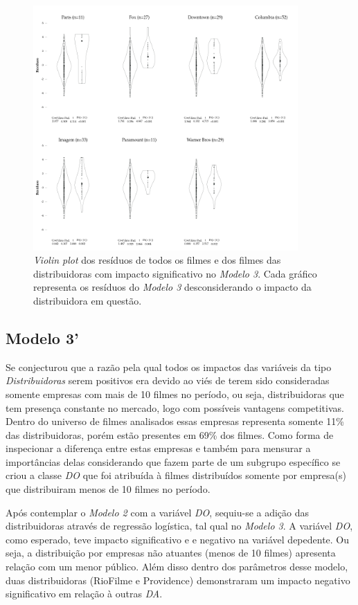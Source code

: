 \documentclass[11pt,a4paper]{article}
\begin{document}
  

\begin{figure}[h!]
\centering
\includegraphics[width=0.9\textwidth]{figura_1.png}
 \caption{\textit{Violin plot} dos resíduos de todos os filmes e dos filmes das distribuidoras com impacto significativo no \textit{Modelo 3}. Cada gráfico representa os resíduos do \textit{Modelo 3} desconsiderando o impacto da distribuidora em questão.}
\label{figure:modelo3}
\end{figure}


\subsection{Modelo 3'}
Se conjecturou que a razão pela qual todos os impactos das variáveis da tipo \textit{Distribuidoras} serem positivos era devido ao viés de terem sido consideradas somente empresas com mais de 10 filmes no período, ou seja, distribuidoras que tem presença constante no mercado, logo com possíveis vantagens competitivas. Dentro do universo de filmes analisados essas empresas representa somente 11\% das distribuidoras, porém estão presentes em 69\% dos filmes. Como forma de inspecionar a diferença entre estas empresas e também para mensurar a importâncias delas considerando que fazem parte de um subgrupo específico se criou a classe \textit{DO} que foi atribuída à filmes distribuídos somente por empresa(s) que distribuiram menos de 10 filmes no período. 

Após contemplar o \textit{Modelo 2} com a variável \textit{DO}, sequiu-se a adição das distribuidoras através de regressão logística, tal qual no \textit{Modelo 3}. A variável \textit{DO}, como esperado, teve impacto significativo e e negativo na variável depedente. Ou seja, a distribuição por empresas não atuantes (menos de 10 filmes) apresenta relação com um menor público. Além disso dentro dos parâmetros desse modelo, duas distribuidoras (RioFilme e Providence) demonstraram um impacto negativo  significativo em relação à outras \textit{DA}.
\end{document}
